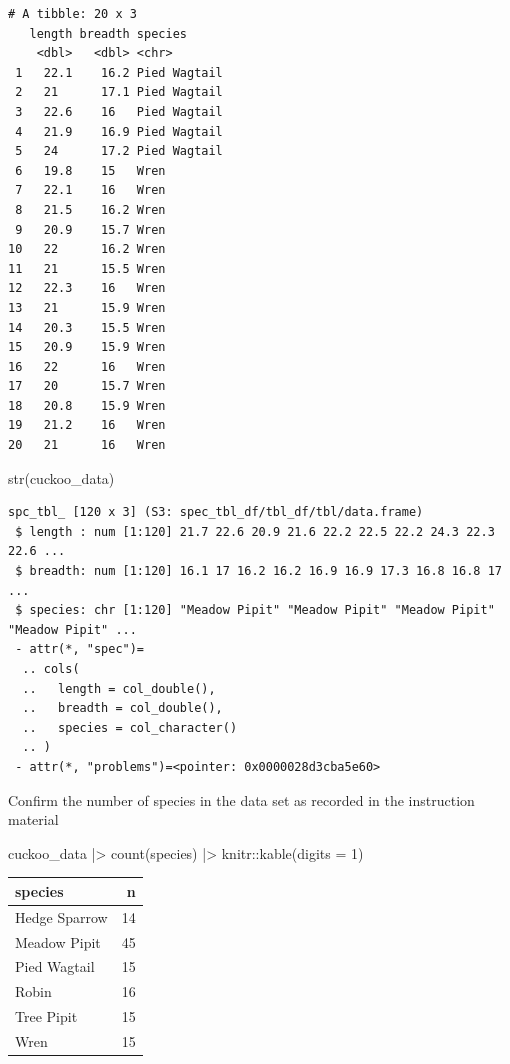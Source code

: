 \documentclass[
  letterpaper,
  DIV=11,
  numbers=noendperiod]{scrartcl}
\newenvironment{Shaded}{\begin{snugshade}}{\end{snugshade}}
\newcommand{\AttributeTok}[1]{\textcolor[rgb]{0.40,0.45,0.13}{#1}}
\newcommand{\DecValTok}[1]{\textcolor[rgb]{0.68,0.00,0.00}{#1}}
\newcommand{\FunctionTok}[1]{\textcolor[rgb]{0.28,0.35,0.67}{#1}}
\newcommand{\NormalTok}[1]{\textcolor[rgb]{0.00,0.23,0.31}{#1}}
\newcommand{\SpecialCharTok}[1]{\textcolor[rgb]{0.37,0.37,0.37}{#1}}
\newcounter{none} %
\begin{document}
\begin{verbatim}
# A tibble: 20 x 3
   length breadth species     
    <dbl>   <dbl> <chr>       
 1   22.1    16.2 Pied Wagtail
 2   21      17.1 Pied Wagtail
 3   22.6    16   Pied Wagtail
 4   21.9    16.9 Pied Wagtail
 5   24      17.2 Pied Wagtail
 6   19.8    15   Wren        
 7   22.1    16   Wren        
 8   21.5    16.2 Wren        
 9   20.9    15.7 Wren        
10   22      16.2 Wren        
11   21      15.5 Wren        
12   22.3    16   Wren        
13   21      15.9 Wren        
14   20.3    15.5 Wren        
15   20.9    15.9 Wren        
16   22      16   Wren        
17   20      15.7 Wren        
18   20.8    15.9 Wren        
19   21.2    16   Wren        
20   21      16   Wren        
\end{verbatim}

\begin{Shaded}
\begin{Highlighting}[]
\FunctionTok{str}\NormalTok{(cuckoo\_data)}
\end{Highlighting}
\end{Shaded}

\begin{verbatim}
spc_tbl_ [120 x 3] (S3: spec_tbl_df/tbl_df/tbl/data.frame)
 $ length : num [1:120] 21.7 22.6 20.9 21.6 22.2 22.5 22.2 24.3 22.3 22.6 ...
 $ breadth: num [1:120] 16.1 17 16.2 16.2 16.9 16.9 17.3 16.8 16.8 17 ...
 $ species: chr [1:120] "Meadow Pipit" "Meadow Pipit" "Meadow Pipit" "Meadow Pipit" ...
 - attr(*, "spec")=
  .. cols(
  ..   length = col_double(),
  ..   breadth = col_double(),
  ..   species = col_character()
  .. )
 - attr(*, "problems")=<pointer: 0x0000028d3cba5e60> 
\end{verbatim}

Confirm the number of species in the data set as recorded in the
instruction material

\begin{Shaded}
\begin{Highlighting}[]
\NormalTok{cuckoo\_data }\SpecialCharTok{|\textgreater{}} 
  \FunctionTok{count}\NormalTok{(species) }\SpecialCharTok{|\textgreater{}} 
\NormalTok{  knitr}\SpecialCharTok{::}\FunctionTok{kable}\NormalTok{(}\AttributeTok{digits =} \DecValTok{1}\NormalTok{)}
\end{Highlighting}
\end{Shaded}

{\def\LTcaptype{none} %
\begin{longtable}[]{@{}lr@{}}
\toprule\noalign{}
species & n \\
\midrule\noalign{}
\endhead
\bottomrule\noalign{}
\endlastfoot
Hedge Sparrow & 14 \\
Meadow Pipit & 45 \\
Pied Wagtail & 15 \\
Robin & 16 \\
Tree Pipit & 15 \\
Wren & 15 \\
\end{longtable}
}
\end{document}
